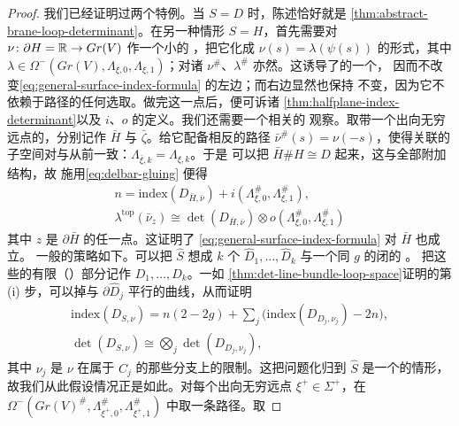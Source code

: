 \begin{proof}
我们已经证明过两个特例。当 $S=D$ 时，陈述恰好就是
\cref{thm:abstract-brane-loop-determinant}。在另一种情形 $S=H$，首先需要对
$\nu\colon\partial H=\mathbb{R}\to Gr(V)$ 作一个小的\trCompactlySupported
\trDeformation，把它化成 $\nu(s)=\lambda(\psi(s))$ 的形式，其中
$\lambda\in\Omega^-(Gr(V),\Lambda_{\xi,0},\Lambda_{\xi,1})$；对诸\trLift{}
$\nu^\#$、$\lambda^\#$ 亦然。这诱导了\trFredholmOperator{}的一个\trDeformation，
因而不改变\eqref{eq:general-surface-index-formula} 的左边；而右边显然也保持
不变，因为它不依赖于路径的任何选取。做完这一点后，便可诉诸
\cref{thm:halfplane-index-determinant}以及 $i$、$o$ 的定义。我们还需要一个相关的
观察。取带一个出向无穷远点的\trUpperHalfPlane，分别记作 $\bar{H}$ 与
$\bar{\zeta}$。给它配备相反的路径 $\bar{\nu}^\#(s)=\nu(-s)$，使得关联的%
\trLagrange{}子空间对与从前一致：$\Lambda_{\bar{\xi},k}=\Lambda_{\xi,k}$。于是
可以把 $\bar{H}\#H\cong D$ \trGluing{}起来，这与全部附加结构\trCompatible，故
施用\eqref{eq:delbar-gluing} 便得
\begin{equation}\label{eq:opposite-halfplane-index}
\begin{gathered}
n=\mathrm{index}(D_{\bar{H},\bar{\nu}})
+i(\Lambda_{\xi,0}^\#,\Lambda_{\xi,1}^\#),\\
\lambda^{\mathrm{top}}(\bar{\nu}_z)\cong\det(D_{\bar{H},\bar{\nu}})
\otimes o(\Lambda_{\xi,0}^\#,\Lambda_{\xi,1}^\#)
\end{gathered}
\end{equation}
其中 $z$ 是 $\partial\bar{H}$ 的任一点。这证明了
\eqref{eq:general-surface-index-formula} 对 $\bar{H}$ 也成立。
一般的策略如下。可以把\trCompactification{} $\hat{S}$ 想成 $k$ 个\trDisk{}
$\hat{D}_1,\ldots,\hat{D}_k$ 与一个同\trGenus{} $g$ 的闭\trSurface{}的%
\trConnectedSum。
把这些\trDisk{}的有限（\trPointedBoundary）部分记作 $D_1,\ldots,D_k$。一如
\cref{thm:det-line-bundle-loop-space}证明的第 (i) 步，可以\trPinch{}掉与
$\partial\hat{D}_j$ 平行的曲线，从而证明
\begin{equation*}
\begin{gathered}
\mathrm{index}(D_{S,\nu})=n(2-2g)
+\sum_j\bigl(\mathrm{index}(D_{D_j,\nu_j})-2n\bigr),\\
\det(D_{S,\nu})\cong\bigotimes_j\det(D_{D_j,\nu_j}),
\end{gathered}
\end{equation*}
其中 $\nu_j$ 是 $\nu$ 在属于 $\hat{C}_j$ 的那些分支上的限制。这把问题化归到
$\hat{S}$ 是一个\trDisk{}的情形，故我们从此假设情况正是如此。对每个出向无穷远点
$\xi^+\in\Sigma^+$，在
$\Omega^-(Gr(V)^\#,\Lambda_{\xi^+,0}^\#,\Lambda_{\xi^+,1}^\#)$ 中取一条路径。取

\end{proof}
